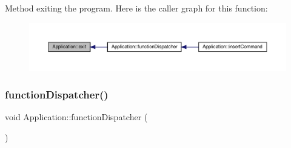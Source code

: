 Method exiting the program. Here is the caller graph for this function\+:
\nopagebreak
\begin{figure}[H]
\begin{center}
\leavevmode
\includegraphics[width=350pt]{class_application_a3c8a98d6c10a5b054800488df16cdbcb_icgraph}
\end{center}
\end{figure}
\mbox{\label{class_application_a00241f0a09c32b0ef3cb1f068475cc50}} 
\subsubsection{\texorpdfstring{function\+Dispatcher()}{functionDispatcher()}}
{\footnotesize\ttfamily void Application\+::function\+Dispatcher (\begin{DoxyParamCaption}{ }\end{DoxyParamCaption})\hspace{0.3cm}{\ttfamily [private]}}

